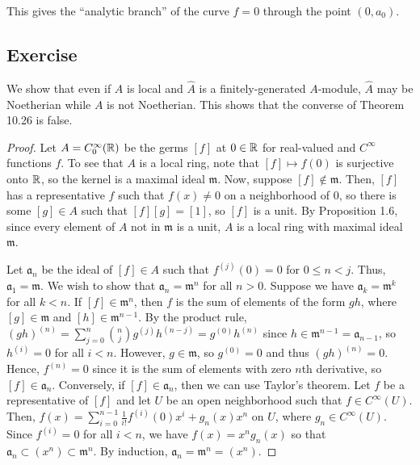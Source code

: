 \begin{remark}
This gives the ``analytic branch'' of the curve $f = 0$ through the point $(0, a_0)$.
\end{remark}

\subsection{Exercise}\label{10.11}

We show that even if $A$ is local and $\hat A$ is a finitely-generated $A$-module, $\hat A$ may be Noetherian
while $A$ is not Noetherian. This shows that the converse of Theorem 10.26 is false.

\begin{proof}
Let $A = C_0^{\infty}(\mathbb{R})$ be the germs $[f]$ at $0 \in \mathbb{R}$ for real-valued and $C^{\infty}$ functions $f$. To see that
$A$ is a local ring, note that $[f] \mapsto f(0)$ is surjective onto $\mathbb{R}$, so the kernel is a maximal ideal $\mathfrak{m}$.
Now, suppose $[f] \not\in \mathfrak{m}$. Then, $[f]$ has a representative $f$ such that $f(x) \neq 0$ on a neighborhood of $0$,
so there is some $[g] \in A$ such that $[f][g] = [1]$, so $[f]$ is a unit. By Proposition 1.6, since every element of $A$ not in 
$\mathfrak{m}$ is a unit, $A$ is a local ring with maximal ideal $\mathfrak{m}$.

Let $\mathfrak{a}_n$ be the ideal of $[f] \in A$ such that $f^{(j)}(0) = 0$ for $0 \le n < j$. Thus, $\mathfrak{a}_1 = \mathfrak{m}$. 
We wish to show that $\mathfrak{a}_n = \mathfrak{m}^n$ for all $n > 0$. Suppose we have $\mathfrak{a}_k = \mathfrak{m}^k$ for all $k < n$. 
If $[f] \in \mathfrak{m}^n$, then $f$ is the sum of elements of the form $gh$, where $[g] \in \mathfrak{m}$ and $[h] \in \mathfrak{m}^{n-1}$.
By the product rule, $(gh)^{(n)} = \sum_{j=0}^n \binom{n}{j} g^{(j)}h^{(n-j)} = g^{(0)}h^{(n)}$ since $h \in \mathfrak{m}^{n-1} = \mathfrak{a}_{n-1}$,
so $h^{(i)} = 0$ for all $i < n$. However, $g \in \mathfrak{m}$, so $g^{(0)} = 0$ and thus $(gh)^{(n)} = 0$. Hence, $f^{(n)} = 0$ since
it is the sum of elements with zero $n$th derivative, so $[f] \in \mathfrak{a}_n$. Conversely, if $[f] \in \mathfrak{a}_n$, then
we can use Taylor's theorem. Let $f$ be a representative of $[f]$ and let $U$ be an open neighborhood such that $f \in C^{\infty}(U)$. 
Then, $f(x) = \sum_{i=0}^{n-1}\frac{1}{i!}f^{(i)}(0)x^i + g_n(x)x^n$ on $U$, where $g_n \in C^{\infty}(U)$. Since $f^{(i)} = 0$ for all $i < n$,
we have $f(x) = x^n g_n(x)$ so that $\mathfrak{a}_n \subset (x^n) \subset \mathfrak{m}^n$. By induction, $\mathfrak{a}_n = \mathfrak{m}^n = (x^n)$.


\end{proof}
